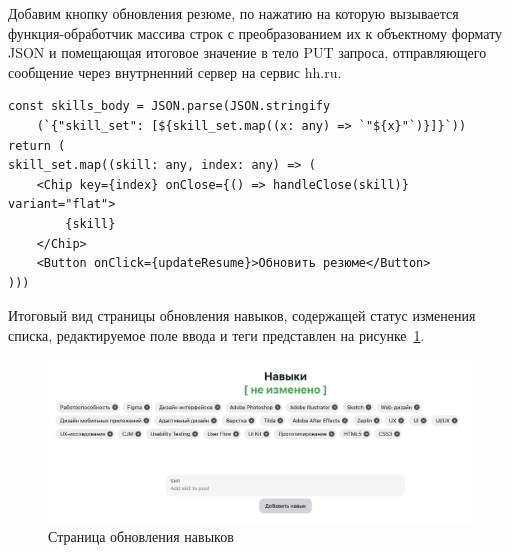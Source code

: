 \documentclass[master, och, diploma]{SCWorks}
\begin{document}
Добавим кнопку обновления резюме, по нажатию на которую вызывается функция-обработчик массива строк с преобразованием их к объектному формату JSON и помещающая итоговое значение в тело PUT запроса, отправляющего сообщение через внутрненний сервер на сервис hh.ru.
\begin{verbatim}
const skills_body = JSON.parse(JSON.stringify
    (`{"skill_set": [${skill_set.map((x: any) => `"${x}"`)}]}`))
return (
skill_set.map((skill: any, index: any) => (
    <Chip key={index} onClose={() => handleClose(skill)} variant="flat">
        {skill}
    </Chip>
    <Button onClick={updateResume}>Обновить резюме</Button>
)))
\end{verbatim}

Итоговый вид страницы обновления навыков, содержащей статус изменения списка, редактируемое поле ввода и теги представлен на рисунке~\ref{fig:32}. 
\begin{figure}[!ht]
    \centering
    \includegraphics[width=12cm]{images/image-update-skills.png}
    \caption{\label{fig:32}%
        Страница обновления навыков}
\end{figure}
\end{document}
